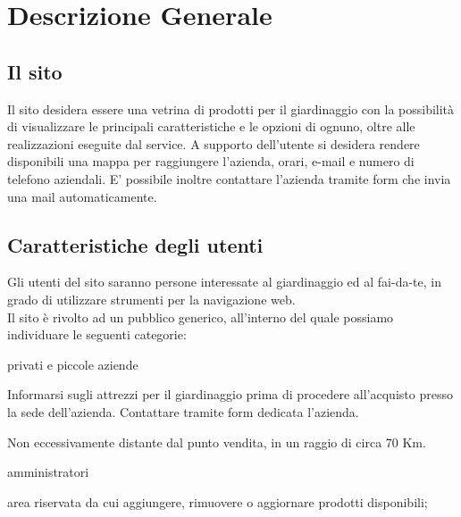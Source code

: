 \section{Descrizione Generale}{
	\subsection{Il sito}{
		Il sito desidera essere una vetrina di prodotti per il giardinaggio con la possibilità di visualizzare le principali caratteristiche e le opzioni di ognuno, oltre alle realizzazioni eseguite dal service.
		A supporto dell'utente si desidera rendere disponibili una mappa per raggiungere l'azienda, orari, e-mail e numero di telefono aziendali.
		E' possibile inoltre contattare l'azienda tramite form che invia una mail automaticamente.
	}
	\subsection{Caratteristiche degli utenti}{
		Gli utenti del sito saranno persone interessate al giardinaggio ed al fai-da-te, in grado di utilizzare strumenti per la navigazione web. \\
		Il sito è rivolto ad un pubblico generico, all'interno del quale possiamo individuare le seguenti categorie:
		\begin{description}\itemsep1pt
			\item[Categoria di utenti:] privati e piccole aziende
			\begin{description}\itemsep1pt
				\item[Funzionalità:] Informarsi sugli attrezzi per il giardinaggio prima di procedere all'acquisto presso la sede dell'azienda. Contattare tramite form dedicata l'azienda.
				\item[Termini generali:] Non eccessivamente distante dal punto vendita, in un raggio di circa 70 Km.
			\end{description}
			\item[Categoria di utenti:] amministratori
			\begin{description}\itemsep1pt
				\item[Funzionalità:] area riservata da cui aggiungere, rimuovere o aggiornare prodotti disponibili;
			\end{description}
		\end{description}
	}
}
